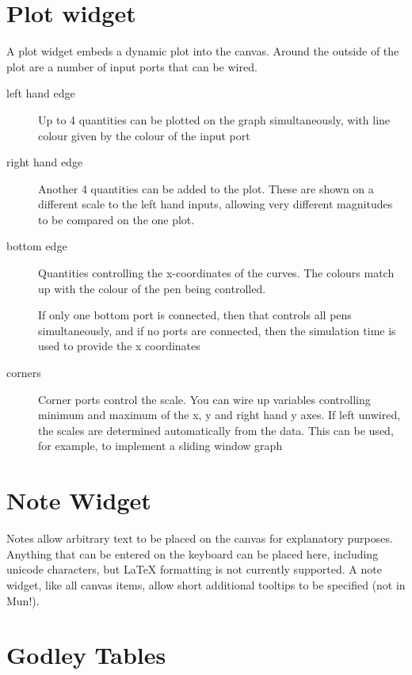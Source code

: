 \section{Plot widget}
\label{Plot}

A plot widget embeds a dynamic plot into the canvas. Around the
outside of the plot are a number of input ports that can be wired.


\begin{description}
\item[left hand edge] Up to 4 quantities can be plotted on the graph
  simultaneously, with line colour given by the colour of the input
  port
\item[right hand edge] Another 4 quantities can be added to the
  plot. These are shown on a different scale to the left hand inputs,
  allowing very different magnitudes to be compared on the one plot.
\item[bottom edge] Quantities controlling the x-coordinates of the
  curves. The colours match up with the colour of the pen being
  controlled.

  If only one bottom port is connected, then that controls all pens
  simultaneously, and if no ports are connected, then the simulation
  time is used to provide the x coordinates
\item[corners] Corner ports control the scale. You can wire up
  variables controlling minimum and maximum of the x, y and right hand
  y axes. If left unwired, the scales are determined automatically
  from the data. This can be used, for example, to implement a sliding
  window graph
\end{description}

\section{Note Widget}
 \label{Notes} Notes allow arbitrary text to be
placed on the canvas for explanatory purposes. Anything that can be
entered on the keyboard can be placed here, including unicode
characters, but LaTeX formatting is not currently supported. A note
widget, like all canvas items, allow short additional tooltips to be
specified (not in Mun!). 

\section{Godley Tables}\label{godley}

